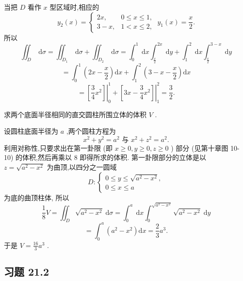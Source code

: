 \begin{solution}

\end{solution}
当把 \(D\) 看作 \(x\) 型区域时,相应的
\[
{y}_{2}\left( x\right)  = \left\{  {\begin{array}{ll} {2x}, & 0 \leq  x \leq  1, \\  3 - x, & 1 < x \leq  2, \end{array}\;{y}_{1}\left( x\right)  = \frac{x}{2}.}\right.
\]
所以
\[
{\iint }_{D}\mathrm{\;d}\sigma  = {\iint }_{{D}_{1}}\mathrm{\;d}\sigma  + {\iint }_{{D}_{2}}\mathrm{\;d}\sigma  = {\int }_{0}^{1}\mathrm{\;d}x{\int }_{\frac{x}{2}}^{2x}\mathrm{\;d}y + {\int }_{1}^{2}\mathrm{\;d}x{\int }_{\frac{x}{2}}^{3 - x}\mathrm{\;d}y
\]
\[
= {\int }_{0}^{1}\left( {{2x} - \frac{x}{2}}\right) \mathrm{d}x + {\int }_{1}^{2}\left( {3 - x - \frac{x}{2}}\right) \mathrm{d}x
\]
\[
= {\left. \left\lbrack  \frac{3}{4}{x}^{2}\right\rbrack  \right| }_{0}^{1} + {\left. \left\lbrack  3x - \frac{3}{4}{x}^{2}\right\rbrack  \right| }_{1}^{2} = \frac{3}{2}.
\]
\begin{example}

\end{example}
求两个底面半径相同的直交圆柱所围立体的体积 \(V\) .

\begin{solution}

\end{solution}
设圆柱底面半径为 \(a\) ,两个圆柱方程为
\[
{x}^{2} + {y}^{2} = {a}^{2}\text{ 与 }{x}^{2} + {z}^{2} = {a}^{2}.
\]
利用对称性,只要求出在第一卦限 (即 \(x \geq  0,y \geq  0,z \geq  0\) ) 部分 (见第十章图 10-10) 的体积,然后再乘以 8 即得所求的体积. 第一卦限部分的立体是以 \(z = \sqrt{{a}^{2} - {x}^{2}}\) 为曲顶,以四分之一圆域
\[
D : \left\{  \begin{array}{l} 0 \leq  y \leq  \sqrt{{a}^{2} - {x}^{2}}, \\  0 \leq  x \leq  a \end{array}\right.
\]
为底的曲顶柱体, 所以
\[
\frac{1}{8}V = {\iint }_{D}\sqrt{{a}^{2} - {x}^{2}}\mathrm{\;d}\sigma  = {\int }_{0}^{a}\mathrm{\;d}x{\int }_{0}^{\sqrt{{a}^{2} - {x}^{2}}}\sqrt{{a}^{2} - {x}^{2}}\mathrm{\;d}y
\]
\[
= {\int }_{0}^{a}\left( {{a}^{2} - {x}^{2}}\right) \mathrm{d}x = \frac{2}{3}{a}^{3}.
\]
于是 \(V = \frac{16}{3}{a}^{3}\) .

\subsection{习题 21.2}

